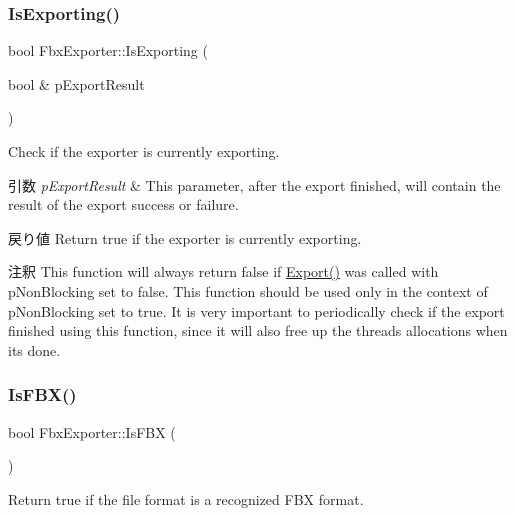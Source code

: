 \subsubsection{\texorpdfstring{Is\+Exporting()}{IsExporting()}}
{\footnotesize\ttfamily bool Fbx\+Exporter\+::\+Is\+Exporting (\begin{DoxyParamCaption}\item[{bool \&}]{p\+Export\+Result }\end{DoxyParamCaption})}

Check if the exporter is currently exporting. 
\begin{DoxyParams}{引数}
{\em p\+Export\+Result} & This parameter, after the export finished, will contain the result of the export success or failure. \\
\hline
\end{DoxyParams}
\begin{DoxyReturn}{戻り値}
Return true if the exporter is currently exporting. 
\end{DoxyReturn}
\begin{DoxyRemark}{注釈}
This function will always return false if \hyperlink{class_fbx_exporter_a8a92372cf76fe3486a798c87973cc791}{Export()} was called with p\+Non\+Blocking set to false. This function should be used only in the context of p\+Non\+Blocking set to true. It is very important to periodically check if the export finished using this function, since it will also free up the thread\textquotesingle{}s allocations when its done. 
\end{DoxyRemark}
\mbox{\label{class_fbx_exporter_a1a304c76e28c89212d8eee1b6f791c38}} 
\subsubsection{\texorpdfstring{Is\+F\+B\+X()}{IsFBX()}}
{\footnotesize\ttfamily bool Fbx\+Exporter\+::\+Is\+F\+BX (\begin{DoxyParamCaption}{ }\end{DoxyParamCaption})}

Return {\ttfamily true} if the file format is a recognized F\+BX format. \mbox{\label{class_fbx_exporter_a2ee7ea29532a88c85f811eff793a5961}} 
